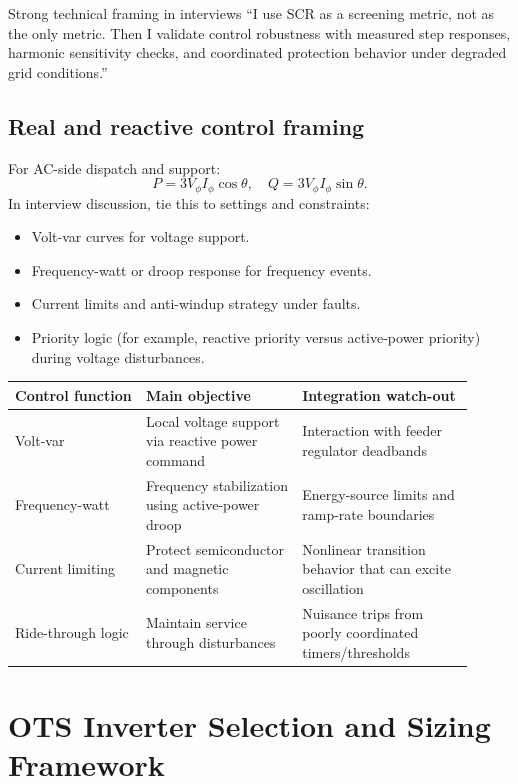 \documentclass[11pt]{article}
\begin{document}
\begin{examplebox}{Strong technical framing in interviews}
``I use SCR as a screening metric, not as the only metric. Then I validate
control robustness with measured step responses, harmonic sensitivity checks,
and coordinated protection behavior under degraded grid conditions.''
\end{examplebox}

\subsection{Real and reactive control framing}
For AC-side dispatch and support:
\[
P = 3 V_{\phi} I_{\phi} \cos\theta, \quad Q = 3 V_{\phi} I_{\phi} \sin\theta.
\]
In interview discussion, tie this to settings and constraints:
\begin{itemize}
  \item Volt-var curves for voltage support.
  \item Frequency-watt or droop response for frequency events.
  \item Current limits and anti-windup strategy under faults.
  \item Priority logic (for example, reactive priority versus active-power priority) during voltage disturbances.
\end{itemize}

\begin{table}[h]
\centering
\begin{tabular}{p{0.26\linewidth}p{0.31\linewidth}p{0.34\linewidth}}
\toprule
Control function & Main objective & Integration watch-out \\
\midrule
Volt-var & Local voltage support via reactive power command & Interaction with feeder regulator deadbands \\
Frequency-watt & Frequency stabilization using active-power droop & Energy-source limits and ramp-rate boundaries \\
Current limiting & Protect semiconductor and magnetic components & Nonlinear transition behavior that can excite oscillation \\
Ride-through logic & Maintain service through disturbances & Nuisance trips from poorly coordinated timers/thresholds \\
\bottomrule
\end{tabular}
\end{table}

\section{OTS Inverter Selection and Sizing Framework}
\end{document}
